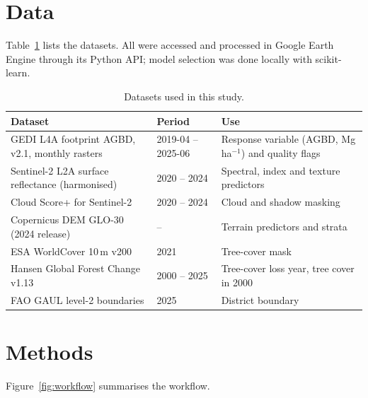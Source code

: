 \documentclass[11pt,a4paper]{article}
\newcommand{\mgha}{Mg\,ha$^{-1}$}
\begin{document}

\section{Data}

Table~\ref{tab:data} lists the datasets. All were accessed and processed in Google Earth
Engine \citep{gorelick2017} through its Python API; model selection was done locally with
scikit-learn.

\begin{table}[htbp]
\centering
\caption{Datasets used in this study.}
\label{tab:data}
\small
\begin{tabularx}{\textwidth}{l l X}
\toprule
Dataset & Period & Use \\
\midrule
GEDI L4A footprint AGBD, v2.1, monthly rasters \citep{dubayah2022} & 2019-04 -- 2025-06 &
  Response variable (AGBD, \mgha{}) and quality flags \\
Sentinel-2 L2A surface reflectance (harmonised) & 2020 -- 2024 &
  Spectral, index and texture predictors \\
Cloud Score+ for Sentinel-2 \citep{pasquarella2023} & 2020 -- 2024 & Cloud and shadow masking \\
Copernicus DEM GLO-30 (2024 release) & -- & Terrain predictors and strata \\
ESA WorldCover 10\,m v200 \citep{zanaga2022} & 2021 & Tree-cover mask \\
Hansen Global Forest Change v1.13 \citep{hansen2013} & 2000 -- 2025 &
  Tree-cover loss year, tree cover in 2000 \\
FAO GAUL level-2 boundaries & 2025 & District boundary \\
\bottomrule
\end{tabularx}
\end{table}

\section{Methods}

Figure~\ref{fig:workflow} summarises the workflow.
\end{document}
